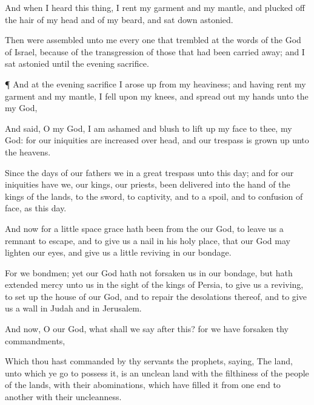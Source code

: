 {And when I
heard this
thing, I
rent my
garment and my
mantle, and plucked
off the
hair of my
head and of my
beard, and sat
down
astonied.

Then were
assembled unto me every one that
trembled at the
words of the
God of
Israel, because of the
transgression of those that had been carried
away; and I
sat
astonied until the
evening
sacrifice.


\par }{\PP {}¶ And at the
evening
sacrifice I arose
up from my
heaviness; and having
rent my
garment and my
mantle, I
fell upon my
knees, and spread
out my
hands unto the
{} my
God,

And
said, O my
God, I am
ashamed and
blush to lift
up my
face to thee, my
God: for our
iniquities are
increased
over
{}
head, and our
trespass is grown
up unto the
heavens.

Since the
days of our
fathers
{} we
{} in a
great
trespass unto this
day; and for our
iniquities have we, our
kings,
{} our
priests, been
delivered into the
hand of the
kings of the
lands, to the
sword, to
captivity, and to a
spoil, and to
confusion of
face, as
{} this
day.

And now for a
little
space
grace hath been
{} from the
{} our
God, to
leave us a remnant to
escape, and to
give us a
nail in his
holy
place, that our
God may
lighten our
eyes, and
give us a
little
reviving in our
bondage.

For we
{}
bondmen; yet our
God hath not
forsaken us in our
bondage, but hath
extended
mercy unto us in the
sight of the
kings of
Persia, to
give us a
reviving, to set
up the
house of our
God, and to
repair the
desolations thereof, and to
give us a
wall in
Judah and in
Jerusalem.

And now, O our
God, what shall we
say
after this? for we have
forsaken thy
commandments,

Which thou hast
commanded
by thy
servants the
prophets,
saying, The
land, unto which ye
go to
possess it, is an
unclean
land with the
filthiness of the
people of the
lands, with their
abominations, which have
filled it from one
end to
another with their
uncleanness.

}
